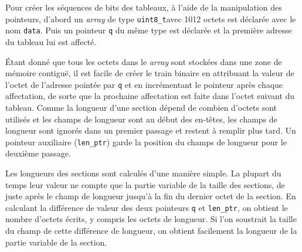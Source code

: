 \documentclass[12pt,a4paper]{article}
\begin{document}
Pour créer les séquences de bits des tableaux, à l'aide de la manipulation des pointeurs, d'abord un \textit{array} de type \texttt{uint8\hspace{0.1mm}\_\hspace{0.1mm}t}avec 1012 octets est déclarée avec le nom \texttt{data}. Puis un pointeur \texttt{q} du même type est déclarée et la première adresse du tableau lui est affecté.

Étant donné que tous les octets dans le \textit{array} sont stockées dans une zone de mémoire contiguë, il est facile de créer le train binaire en attribuant la valeur de l'octet de l'adresse pointée par \texttt{q} et en incrémentant le pointeur après chaque affectation, de sorte que la prochaine affectation est faite dans l'octet suivant du tableau. Comme la longueur d'une section dépend de combien d'octets sont utilisés et les champs de longueur sont au début des en-têtes, les champs de longueur sont ignorés dans un premier passage et restent à remplir plus tard. Un pointeur auxiliaire (\texttt{len\hspace{0.1mm}\_\hspace{0.1mm}ptr}) garde la position du champs de longueur pour le deuxième passage.


Les longueurs des sections sont calculés d'une manière simple. La plupart du temps leur valeur ne compte que la partie variable de la taille des sections, de juste après le champ de longueur jusqu'à la fin du dernier octet de la section. En calculant la différence de valeur des deux pointeurs \texttt{q} et \texttt{len\hspace{0.1mm}\_\hspace{0.1mm}ptr}, on obtient le nombre d'octets écrits, y compris les octets de longueur. Si l'on soustrait la taille du champ de cette différence de longueur, on obtient facilement la longueur de la partie variable de la section.
\end{document}
